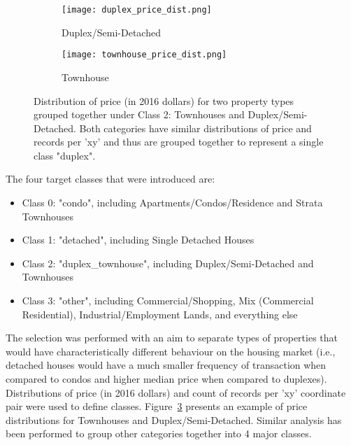 \begin{figure}[ht]
    \centering
    \begin{subfigure}{\linewidth}
        \centering
        \texttt{[image: duplex\_price\_dist.png]}
        \label{fig:duplex_price_dist}
        \caption{Duplex/Semi-Detached}
    \end{subfigure}

    \begin{subfigure}{\linewidth}
        \centering
        \texttt{[image: townhouse\_price\_dist.png]}
        \label{fig:townhouse_price_dist}
        \caption{Townhouse}
    \end{subfigure}
    \caption{Distribution of price (in 2016 dollars) for two property types grouped together under Class 2: Townhouses and Duplex/Semi-Detached.
    Both categories have similar distributions of price and records per 'xy' and thus are grouped together to represent a single class "duplex".}
    \label{fig:class_2_price_dist}
\end{figure}

The four target classes that were introduced are:

\begin{itemize}
    \item Class 0: "condo", including Apartments/Condos/Residence and Strata Townhouses
    \item Class 1: "detached", including Single Detached Houses
    \item Class 2: "duplex\_townhouse", including Duplex/Semi-Detached and Townhouses
    \item Class 3: "other", including Commercial/Shopping, Mix (Commercial Residential), Industrial/Employment Lands, and everything else
\end{itemize}

The selection was performed with an aim to separate types of properties that would have characteristically different behaviour on the housing market (i.e., detached houses would have a much smaller frequency of transaction when compared to condos and higher median price when compared to duplexes).
Distributions of price (in 2016 dollars) and count of records per 'xy' coordinate pair were used to define classes.
Figure~\ref{fig:class_2_price_dist} presents an example of price distributions for Townhouses and Duplex/Semi-Detached.
Similar analysis has been performed to group other categories together into 4 major classes.

